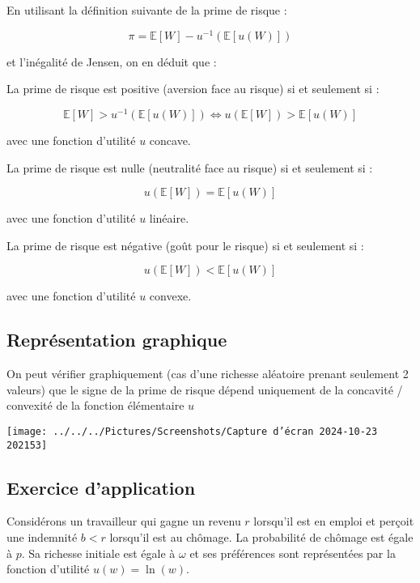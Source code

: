\documentclass[a4paper, 12pt]{report}
\begin{document}
En utilisant la définition suivante de la prime de risque :

\[
\pi = \mathbb{E}[W] - u^{-1} \left( \mathbb{E}\left[ u(W) \right] \right)
\]

et l'inégalité de Jensen, on en déduit que :

La prime de risque est positive (aversion face au risque) si et seulement si :

\[
\mathbb{E}[W] > u^{-1} \left( \mathbb{E}\left[ u(W) \right] \right) \iff u \left( \mathbb{E}[W] \right) > \mathbb{E}\left[ u(W) \right]
\]

avec une fonction d'utilité \( u \) concave.

La prime de risque est nulle (neutralité face au risque) si et seulement si :

\[
u \left( \mathbb{E}[W] \right) = \mathbb{E}\left[ u(W) \right]
\]

avec une fonction d'utilité \( u \) linéaire.

La prime de risque est négative (goût pour le risque) si et seulement si :

\[
u \left( \mathbb{E}[W] \right) < \mathbb{E}\left[ u(W) \right]
\]

avec une fonction d'utilité \( u \) convexe.

\subsection{Représentation graphique}

On peut vérifier graphiquement (cas d'une richesse aléatoire prenant
seulement 2 valeurs) que le signe de la prime de risque dépend
uniquement de la concavité / convexité de la fonction élémentaire \( u \)
\begin{center}
	\texttt{[image: ../../../Pictures/Screenshots/Capture d'écran 2024-10-23 202153]}
\end{center}

\subsection{Exercice d'application} 

Considérons un travailleur qui gagne un revenu \( r \) lorsqu'il est en emploi et perçoit une indemnité \( b < r \) lorsqu'il est au chômage. La probabilité de chômage est égale à \( p \). Sa richesse initiale est égale à \( \omega \) et ses préférences sont représentées par la fonction d'utilité \( u(w) = \ln(w) \).
\end{document}
